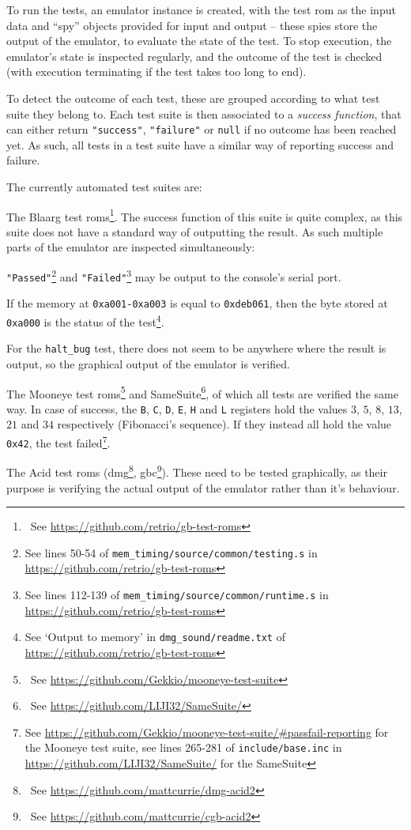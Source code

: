 \documentclass[11pt]{informatics-report}
\newcommand{\ftnt}[1]{\footnote{~See \url{#1}}}
\begin{document}
To run the tests, an emulator instance is created, with the test \gls{rom} as the input data and ``spy'' objects provided for input and output -- these spies store the output of the emulator, to evaluate the state of the test. To stop execution, the emulator's state is inspected regularly, and the outcome of the test is checked (with execution terminating if the test takes too long to end).

To detect the outcome of each test, these are grouped according to what test suite they belong to. Each test suite is then associated to a \textit{success function}, that can either return \texttt{"success"}, \texttt{"failure"} or \texttt{null} if no outcome has been reached yet. As such, all tests in a test suite have a similar way of reporting success and failure.

The currently automated test suites are:
\begin{compactitem}
	\item The Blaarg test \glspl{rom}\ftnt{https://github.com/retrio/gb-test-roms}. The success function of this suite is quite complex, as this suite does not have a standard way of outputting the result. As such multiple parts of the emulator are inspected simultaneously:
		\begin{compactitem}
			\item \texttt{"Passed"}\footnote{See lines 50-54 of \texttt{mem\_timing/source/common/testing.s} in \url{https://github.com/retrio/gb-test-roms}} and \texttt{"Failed"}\footnote{See lines 112-139 of \texttt{mem\_timing/source/common/runtime.s} in \url{https://github.com/retrio/gb-test-roms}} may be output to the console's serial port.
			\item If the memory at \texttt{0xa001-0xa003} is equal to \texttt{0xdeb061}, then the byte stored at \texttt{0xa000} is the status of the test\footnote{See `Output to memory' in \texttt{dmg\_sound/readme.txt} of \url{https://github.com/retrio/gb-test-roms}}.
			\item For the \texttt{halt\_bug} test, there does not seem to be anywhere where the result is output, so the graphical output of the emulator is verified.
		\end{compactitem}
	\item The Mooneye test \glspl{rom}\ftnt{https://github.com/Gekkio/mooneye-test-suite} and SameSuite\ftnt{https://github.com/LIJI32/SameSuite/}, of which all tests are verified the same way. In case of success, the \texttt{B}, \texttt{C}, \texttt{D}, \texttt{E}, \texttt{H} and \texttt{L} registers hold the values $3$, $5$, $8$, $13$, $21$ and $34$ respectively (Fibonacci's sequence). If they instead all hold the value \texttt{0x42}, the test failed\footnote{See \url{https://github.com/Gekkio/mooneye-test-suite/\#passfail-reporting} for the Mooneye test suite, see lines 265-281 of \texttt{include/base.inc} in \url{https://github.com/LIJI32/SameSuite/} for the SameSuite}.
	\item The Acid test \glspl{rom} (\gls{dmg}\ftnt{https://github.com/mattcurrie/dmg-acid2}, \gls{gbc}\ftnt{https://github.com/mattcurrie/cgb-acid2}). These need to be tested graphically, as their purpose is verifying the actual output of the emulator rather than it's behaviour.
\end{compactitem}
\end{document}
